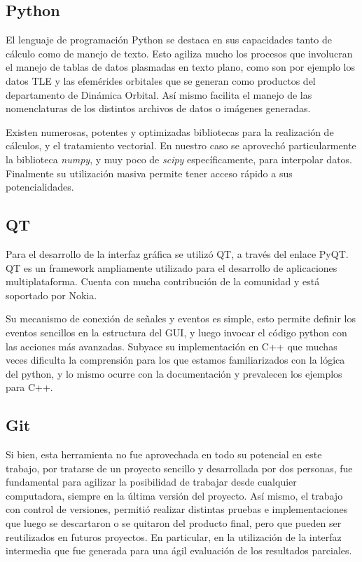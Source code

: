 \subsection*{Python}
El lenguaje de programaci\'on Python se destaca en sus capacidades tanto de c\'alculo como de manejo de texto. Esto agiliza mucho los procesos que involucran el manejo de tablas de datos plasmadas en texto plano, como son por ejemplo los datos TLE y las efem\'erides orbitales que se generan como productos del departamento de Din\'amica Orbital. As\'i mismo facilita el manejo de las nomenclaturas de los distintos archivos de datos o im\'agenes generadas.

Existen numerosas, potentes y optimizadas bibliotecas para la realizaci\'on de c\'alculos, y el tratamiento vectorial. En nuestro caso se aprovech\'o particularmente la biblioteca {\it{numpy}}, y muy poco de {\it{scipy}} espec\'ificamente, para interpolar datos.
Finalmente su utilizaci\'on masiva permite tener acceso r\'apido a sus potencialidades.\\

\subsection*{QT}
Para el desarrollo de la interfaz gr\'afica se utiliz\'o QT, a trav\'es del enlace PyQT.
QT es un framework ampliamente utilizado para el desarrollo de aplicaciones multiplataforma. Cuenta con mucha contribuci\'on de la comunidad y est\'a soportado por Nokia.

Su mecanismo de conexión de señales y eventos es simple, esto permite definir los eventos sencillos en la estructura del GUI, y luego invocar el c\'odigo python con las acciones m\'as avanzadas. Subyace su implementaci\'on en C++ que muchas veces dificulta la comprensi\'on para los que estamos familiarizados con la l\'ogica del python, y lo mismo ocurre con la documentaci\'on y prevalecen los ejemplos para C++.\\

\subsection*{Git}
Si bien, esta herramienta no fue aprovechada en todo su potencial en este trabajo, por tratarse de un proyecto sencillo y desarrollada por dos personas, fue fundamental para agilizar la posibilidad de trabajar desde cualquier computadora, siempre en la \'ultima versi\'on del proyecto.
As\'i mismo, el trabajo con control de versiones, permiti\'o realizar distintas pruebas e implementaciones que luego se descartaron o se quitaron del producto final, pero que pueden ser reutilizados en futuros proyectos. En particular, en la utilizaci\'on de la interfaz intermedia que fue generada para una \'agil evaluaci\'on de los resultados parciales.\\





